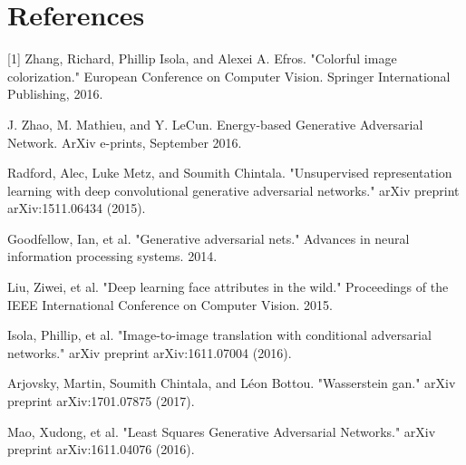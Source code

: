 \documentclass{article}
\begin{document}
\section{References}
[1] Zhang, Richard, Phillip Isola, and Alexei A. Efros. "Colorful image colorization." 
European Conference on Computer Vision. Springer International Publishing, 2016.
\vspace{2pt}

\noindent [2] J. Zhao, M. Mathieu, and Y. LeCun.  Energy-based Generative Adversarial 
Network. ArXiv e-prints, September 2016.
\vspace{2pt}

\noindent [3] Radford, Alec, Luke Metz, and Soumith Chintala. "Unsupervised representation learning with deep
convolutional generative adversarial networks." arXiv preprint arXiv:1511.06434 (2015).

\noindent [4] Goodfellow, Ian, et al. "Generative adversarial nets." Advances in neural information processing systems. 2014.

\noindent [5] Liu, Ziwei, et al. "Deep learning face attributes in the wild." Proceedings of the IEEE International Conference on Computer Vision. 2015.

\noindent [6] Isola, Phillip, et al. "Image-to-image translation with conditional adversarial networks." arXiv preprint arXiv:1611.07004 (2016).

\noindent [7] Arjovsky, Martin, Soumith Chintala, and Léon Bottou. "Wasserstein gan." arXiv preprint arXiv:1701.07875 (2017).

\noindent [8] Mao, Xudong, et al. "Least Squares Generative Adversarial Networks." arXiv preprint arXiv:1611.04076 (2016).
\end{document}

